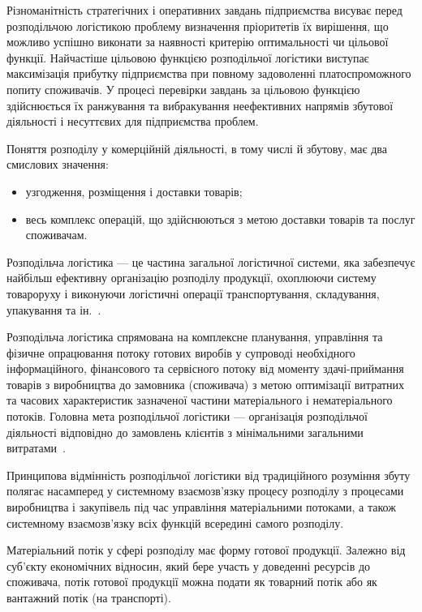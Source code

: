 Різноманітність стратегічних і оперативних завдань підприємства висуває перед розподільчою логістикою проблему визначення пріоритетів їх вирішення, що можливо успішно виконати за наявності критерію оптимальності чи цільової функції. 
Найчастіше цільовою функцією розподільчої логістики виступає максимізація прибутку підприємства при повному задоволенні платоспроможного попиту споживачів. 
У процесі перевірки завдань за цільовою функцією здійснюється їх ранжування та вибракування неефективних напрямів збутової діяльності і несуттєвих для підприємства проблем.

Поняття розподілу у комерційній діяльності, в тому числі й збутову, має два смислових значення:
\begin{itemize}
	\item узгодження, розміщення і доставки товарів; 
	\item весь комплекс операцій, що здійснюються з метою доставки товарів та послуг споживачам. 
\end{itemize}

Розподільча логістика --- це частина загальної логістичної системи, яка забезпечує найбільш ефективну організацію розподілу продукції, охоплюючи систему товароруху і виконуючи логістичні операції транспортування, складування, упакування та ін.~\cite{Kusluy2010}.

Розподільча логістика спрямована на комплексне планування, управління та фізичне опрацювання потоку готових виробів у супроводі необхідного інформаційного, фінансового та сервісного потоку від моменту здачі-приймання товарів з виробництва до замовника (споживача) з метою оптимізації витратних та часових характеристик зазначеної частини матеріального і нематеріального потоків.
Головна мета розподільчої логістики --- організація розподільчої діяльності відповідно до замовлень клієнтів з мінімальними загальними витратами~\cite{Kusluy2010}.

Принципова відмінність розподільчої логістики від традиційного розуміння збуту полягає насамперед у системному взаємозв'язку процесу розподілу з процесами виробництва і закупівель під час управління матеріальними потоками, а також системному взаємозв'язку всіх функцій всередині самого розподілу.

Матеріальний потік у сфері розподілу має форму готової продукції.
Залежно від суб'єкту економічних відносин, який бере участь у доведенні ресурсів до споживача, потік готової продукції можна подати як товарний потік або як вантажний потік (на транспорті).

